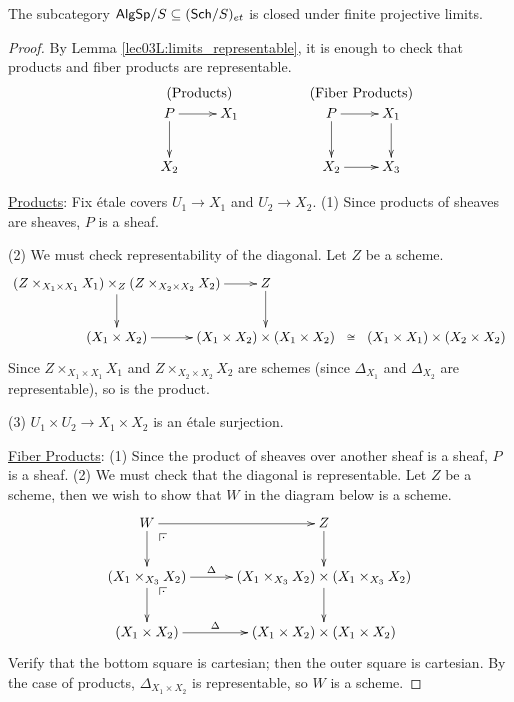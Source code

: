  \begin{proposition}
   The subcategory $\text{\sf AlgSp}/S \subseteq (\text{\sf Sch}/S)_{et}$ is closed under finite projective
   limits.
 \end{proposition}
 \begin{proof}
   By Lemma \ref{lec03L:limits_representable}, it is enough to check that products and
   fiber products are representable.
   \[\begin{tabular}{cc}
     \hspace{4em} \text{(Products)} \hspace{4em} & \text{(Fiber Products)}\\
     \xymatrix{
       P\ar[r] \ar[d] & X_1\\
       X_2 & }
    &\xymatrix{
       P\ar[r] \ar[d] & X_1\ar[d]\\
       X_2\ar[r] & X_3}
   \end{tabular}\]

   \underline{Products}: Fix \'etale covers $U_1\to X_1$ and $U_2\to X_2$. (1) Since products of
   sheaves are sheaves, $P$ is a sheaf.

   (2) We must check representability of the diagonal. Let $Z$ be a scheme.
   \[\xymatrix@C=-2pc{
    (Z\times_{X_1\times X_1} X_1) \times_Z (Z\times_{X_2\times X_2} X_2)
    \ar[r] \ar[d] & Z \ar[d]\\
    (X_1\times X_2) \ar[r] & (X_1\times X_2)\times (X_1\times X_2)
    \ar@{}[rr]|<>(.5){\cong}
    & \hspace{5pc} & (X_1\times X_1)\times (X_2\times X_2)
   }\]
   Since $Z\times_{X_1\times X_1} X_1$ and $Z\times_{X_2\times X_2} X_2$ are schemes
   (since $\Delta_{X_1}$ and $\Delta_{X_2}$ are representable), so is the product.

   (3) $U_1\times U_2\to X_1\times X_2$ is an \'etale surjection.

   \smallskip
    \underline{Fiber Products}: (1) Since the product of sheaves over another sheaf is a sheaf, $P$
    is a sheaf. (2) We must check that the diagonal is representable. Let $Z$ be a scheme,
    then we wish to show that $W$ in the diagram below is a scheme.
    \[\xymatrix@C-1pc{
     W \ar[d]\ar[rr] \ar@{}[dr]|(.25)\pb & & Z\ar[d]\\
     (X_1\times_{X_3} X_2)\ar@{}[dr]|(.25)\pb \ar[d] \ar[rr]^<>(.5)\Delta & & (X_1\times_{X_3} X_2)\times (X_1\times_{X_3} X_2)\ar[d]\\
     (X_1\times X_2) \ar[rr]^<>(.5)\Delta & & (X_1\times X_2)\times (X_1\times X_2)\\
    }\]
    Verify that the bottom square is cartesian; then the outer square is cartesian. By
    the case of products, $\Delta_{X_1\times X_2}$ is representable, so $W$ is a scheme.


\end{proof}
